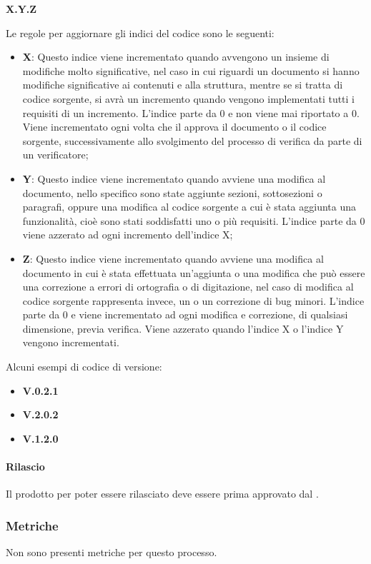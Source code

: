 \begin{center}
	\textbf{X.Y.Z}
\end{center}
Le regole per aggiornare gli indici del codice sono le seguenti:
\begin{itemize}
	\item \textbf{X}: Questo indice viene incrementato quando avvengono un insieme di modifiche molto significative, nel caso in cui riguardi un documento si hanno modifiche significative ai contenuti e alla struttura, mentre se si tratta di codice sorgente, si avrà un incremento quando vengono implementati tutti i requisiti di un incremento.
	L'indice parte da 0 e non viene mai riportato a 0. Viene incrementato ogni volta che il \Responsabile{} approva il documento o il codice sorgente, successivamente allo svolgimento del processo di verifica da parte di un verificatore;
	\item \textbf{Y}: Questo indice viene incrementato quando avviene una modifica al documento, nello specifico sono state aggiunte sezioni, sottosezioni o paragrafi, oppure una modifica al codice sorgente a cui è stata aggiunta una funzionalità, cioè sono stati soddisfatti uno o più requisiti.
	L'indice parte da 0 viene azzerato ad ogni incremento dell'indice X;
	\item \textbf{Z}: Questo indice viene incrementato quando avviene una modifica al documento in cui è stata effettuata un'aggiunta o una modifica che può essere una correzione a errori di ortografia o di digitazione, nel caso di modifica al codice sorgente rappresenta invece, un  o un correzione di bug minori.
	L'indice parte da 0 e viene incrementato ad ogni modifica e correzione, di qualsiasi dimensione, previa verifica.
	Viene azzerato quando l'indice X o l'indice Y vengono incrementati.
\end{itemize}
Alcuni esempi di codice di versione:
\begin{itemize}
	\item \textbf{V.0.2.1}
	\item \textbf{V.2.0.2}
	\item \textbf{V.1.2.0}
\end{itemize}
\paragraph*{Rilascio}
Il prodotto per poter essere rilasciato deve essere prima approvato dal \Responsabile{}.

\subsubsection{Metriche}
Non sono presenti metriche per questo processo.


